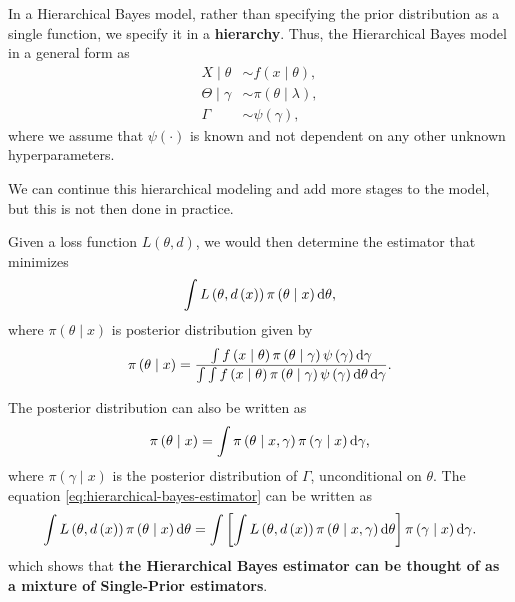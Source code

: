 In a Hierarchical Bayes model, rather than specifying the prior distribution as a single function, we specify it in a \textbf{hierarchy}. Thus, the Hierarchical Bayes model in a general form as
\begin{equation}
	\begin{aligned}
		X\mid\theta      & \sim f\left(x\mid\theta\right),         \\
		\Theta\mid\gamma & \sim \pi\left(\theta\mid\lambda\right), \\
		\Gamma           & \sim \psi\left(\gamma\right),
	\end{aligned}
	\label{eq:hierarchical-bayes}
\end{equation}
where we assume that $\psi\left(\cdot\right)$ is known and not dependent on any other unknown hyperparameters.

\begin{remark}
	We can continue this hierarchical modeling and add more stages to the model, but this is not then done in practice.
\end{remark}

Given a loss function $L\left(\theta,d\right)$, we would then determine the estimator that minimizes
\begin{equation} \label{eq:hierarchical-bayes-estimator}
	\int L\left(\theta,d\left(x\right)\right)\pi\left(\theta\mid x\right)\mathop{}\!\mathrm{d}\theta,
\end{equation}
where $\pi\left(\theta\mid x\right)$ is posterior distribution given by
\begin{equation*}
	\pi\left(\theta\mid x\right)=\frac{\int f\left(x\mid\theta\right)\pi\left(\theta\mid\gamma\right)\psi\left(\gamma\right)\mathop{}\!\mathrm{d}\gamma}{\int\int f\left(x\mid\theta\right)\pi\left(\theta\mid\gamma\right)\psi\left(\gamma\right)\mathop{}\!\mathrm{d}\theta\mathop{}\!\mathrm{d}\gamma}.
\end{equation*}

\begin{remark}
	The posterior distribution can also be written as
	\begin{equation*}
		\pi\left(\theta\mid x\right)=\int\pi\left(\theta\mid x,\gamma\right)\pi\left(\gamma\mid x\right)\mathop{}\!\mathrm{d}\gamma,
	\end{equation*}
	where $\pi\left(\gamma\mid x\right)$ is the posterior distribution of $\Gamma$, unconditional on $\theta$. The equation \ref{eq:hierarchical-bayes-estimator} can be written as
	\begin{equation*}
		\int L\left(\theta,d\left(x\right)\right)\pi\left(\theta\mid x\right)\mathop{}\!\mathrm{d}\theta = \int\left[\int L\left(\theta,d\left(x\right)\right)\pi\left(\theta\mid x,\gamma\right)\mathop{}\!\mathrm{d}\theta\right]\pi\left(\gamma\mid x\right)\mathop{}\!\mathrm{d}\gamma.
	\end{equation*}
	which shows that \textbf{the Hierarchical Bayes estimator can be thought of as a mixture of Single-Prior estimators}.
\end{remark}

